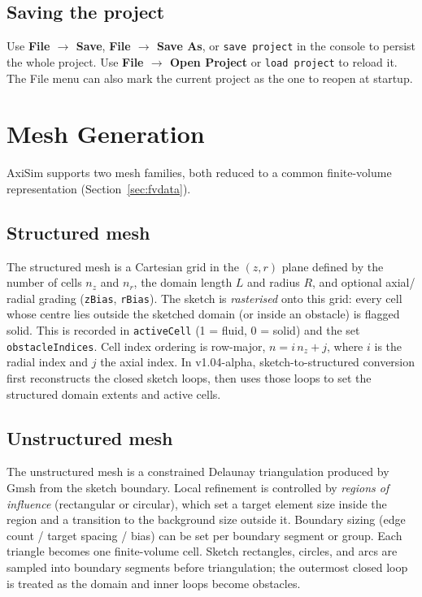 \documentclass[11pt]{article}
\begin{document}
\subsection{Saving the project}
Use \textbf{File \(\rightarrow\) Save}, \textbf{File \(\rightarrow\) Save As}, or
\texttt{save project} in the console to persist the whole project. Use
\textbf{File \(\rightarrow\) Open Project} or \texttt{load project} to reload it. The
File menu can also mark the current project as the one to reopen at startup.

\section{Mesh Generation}\label{sec:mesh}
AxiSim supports two mesh families, both reduced to a common finite-volume
representation (Section~\ref{sec:fvdata}).

\subsection{Structured mesh}
The structured mesh is a Cartesian grid in the \((z, r)\) plane defined by the number of
cells \(n_z\) and \(n_r\), the domain length \(L\) and radius \(R\), and optional axial/
radial grading (\texttt{zBias}, \texttt{rBias}). The sketch is \emph{rasterised} onto this
grid: every cell whose centre lies outside the sketched domain (or inside an obstacle)
is flagged solid. This is recorded in \texttt{activeCell} (1 = fluid, 0 = solid) and the
set \texttt{obstacleIndices}. Cell index ordering is row-major, \(n = i\,n_z + j\), where
\(i\) is the radial index and \(j\) the axial index. In v1.04-alpha, sketch-to-structured
conversion first reconstructs the closed sketch loops, then uses those loops to set the
structured domain extents and active cells.

\subsection{Unstructured mesh}
The unstructured mesh is a constrained Delaunay triangulation produced by Gmsh from the
sketch boundary. Local refinement is controlled by \emph{regions of influence}
(rectangular or circular), which set a target element size inside the region and a
transition to the background size outside it. Boundary sizing (edge count / target
spacing / bias) can be set per boundary segment or group. Each triangle becomes one
finite-volume cell. Sketch rectangles, circles, and arcs are sampled into boundary
segments before triangulation; the outermost closed loop is treated as the domain and
inner loops become obstacles.
\end{document}
